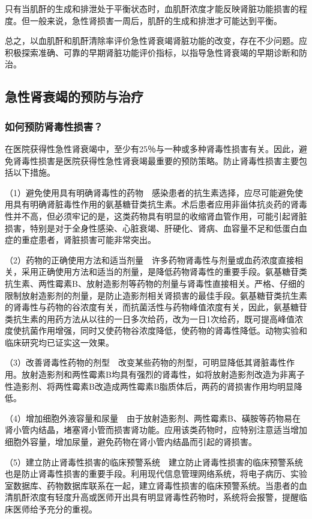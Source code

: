 只有当肌酐的生成和排泄处于平衡状态时，血肌酐浓度才能反映肾脏功能损害的程度。但一般来说，急性肾损害一周后，肌酐的生成和排泄才可能达到平衡。

总之，以血肌酐和肌酐清除率评价急性肾衰竭肾脏功能的改变，存在不少问题。应积极探索准确、可靠的早期肾脏功能评价指标，以指导急性肾衰竭的早期诊断和防治。

\subsection{急性肾衰竭的预防与治疗}

\subsubsection{如何预防肾毒性损害？}

在医院获得性急性肾衰竭中，至少有25％与一种或多种肾毒性损害有关。因此，避免肾毒性损害是医院获得性急性肾衰竭最重要的预防策略。防止肾毒性损害主要包括以下措施。

（1）避免使用具有明确肾毒性的药物　感染患者的抗生素选择，应尽可能避免使用具有明确肾脏毒性作用的氨基糖苷类抗生素。术后患者应用非甾体抗炎药的肾毒性并不高，但必须牢记的是，这类药物具有明显的收缩肾血管作用，可能引起肾脏损害，特别是对于全身性感染、心脏衰竭、肝硬化、肾病、血容量不足和低蛋白血症的重症患者，肾脏损害可能非常突出。

（2）药物的正确使用方法和适当剂量　许多药物肾毒性与剂量或血药浓度直接相关，采用正确使用方法和适当的剂量，是降低药物肾毒性的重要手段。氨基糖苷类抗生素、两性霉素B、放射造影剂等药物的剂量与肾毒性直接相关。严格、仔细的限制放射造影剂的剂量，是防止造影剂相关肾损害的最佳手段。氨基糖苷类抗生素的肾毒性与药物的谷浓度有关，而抗菌活性与药物峰值浓度有关，因此，氨基糖苷类抗生素的用药方法从以往的一日多次给药，改为一日1次给药，既可提高峰值浓度使抗菌作用增强，同时又使药物谷浓度降低，使药物的肾毒性降低。动物实验和临床研究均已证实这一效果。

（3）改善肾毒性药物的剂型　改变某些药物的剂型，可明显降低其肾脏毒性作用。放射造影剂和两性霉素B均具有强烈的肾毒性，如将放射造影剂改造为非离子性造影剂、将两性霉素B改造成两性霉素B脂质体后，两药的肾损害作用均明显降低。

（4）增加细胞外液容量和尿量　由于放射造影剂、两性霉素B、磺胺等药物易在肾小管内结晶，堵塞肾小管而损害肾功能。应用该类药物时，应特别注意适当增加细胞外容量，增加尿量，避免药物在肾小管内结晶而引起的肾损害。

（5）建立防止肾毒性损害的临床预警系统　建立防止肾毒性损害的临床预警系统也是防止肾毒性损害的重要手段。利用现代信息管理网络系统，将电子病历、实验室数据库、药物数据库联系在一起，建立肾毒性损害的临床预警系统。当患者的血清肌酐浓度有轻度升高或医师开出具有明显肾毒性药物时，系统将会报警，提醒临床医师给予充分的重视。


